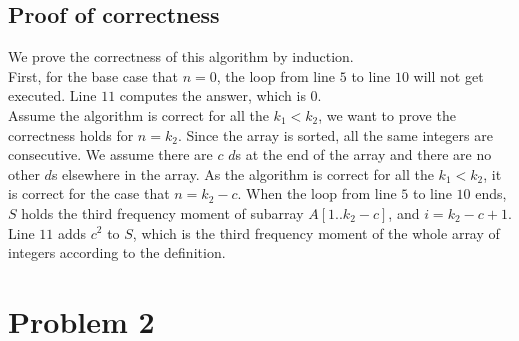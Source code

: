 \documentclass[letterpaper, 11pt]{article}
\begin{document}
\subsection{Proof of correctness}
% 
We prove the correctness of this algorithm by induction. \\
First, for the base case that $n=0$, the loop from line $5$ to line $10$ will not get executed. Line $11$ computes the answer, which is $0$.\\
Assume the algorithm is correct for all the $k_1 < k_2$, we want to prove the correctness holds for $n=k_2$.
Since the array is sorted, all the same integers are consecutive. We assume there are $c$ $d$s at the end of the array and there are no other $d$s elsewhere in the array. As the algorithm is correct for all the $k_1 < k_2$, it is correct for the case that $n = k_2 - c$. When the loop from line $5$ to line $10$ ends, $S$ holds the third frequency moment of subarray $A[1..k_2-c]$, and $i=k_2-c+1$. Line $11$ adds $c^2$ to $S$, which is the third frequency moment of the whole array
of integers according to the definition. 
\section{Problem 2}
\end{document}
